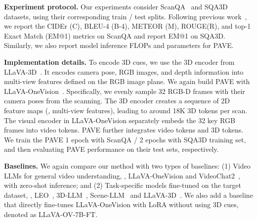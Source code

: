 \medskip
\noindent\textbf{Experiment protocol.} Our experiments consider ScanQA~\cite{azuma_2022_CVPR} and SQA3D~\cite{ma2022sqa3d} datasets, using their corresponding train / test splits. 
Following previous work~\cite{zhu2024llava3dsimpleeffectivepathway}, we report the CIDEr (C), BLEU-4 (B-4), METEOR (M), ROUGE(R), and top-1 Exact Match (EM@1) metrics on ScanQA and report EM@1 on SQA3D. Similarly, we also report model inference FLOPs and parameters for PAVE. 

\medskip
\noindent\textbf{Implementation details.}
To encode 3D cues, we use the 3D encoder from LLaVA-3D~\cite{zhu2024llava3dsimpleeffectivepathway}. It encodes camera pose, RGB images, and depth information into multi-view features defined on the RGB image plane. We again build PAVE with LLaVA-OneVision~\cite{li2024llava}. Specifically, we evenly sample 32 RGB-D frames with their camera poses from the scanning. The 3D encoder creates a sequence of 2D feature maps (\ie, multi-view features), leading to around 18K 3D tokens per scan. The visual encoder in LLaVA-OneVision separately embeds the 32 key RGB frames into video tokens. PAVE further integrates video tokens and 3D tokens. We train the PAVE 1 epoch with ScanQA / 2 epochs with SQA3D training set, and then evaluating PAVE performance on their test sets, respectively.

\medskip
\noindent\textbf{Baselines.} We again compare our method with two types of baselines: 
(1) Video LLMs for general video understanding, \eg, LLaVA-OneVision\cite{li2024llava} and VideoChat2~\cite{li2023mvbench}, with zero-shot inference; and 
(2) Task-specific models fine-tuned on the target dataset, \eg, LEO~\cite{huang2023embodied}, 3D-LLM~\cite{hong20233d}, Scene-LLM~\cite{fu2024scenellmextendinglanguagemodel} and LLaVA-3D~\cite{zhu2024llava3dsimpleeffectivepathway}. 
We also add a baseline that directly fine-tunes LLaVA-OneVision with LoRA without using 3D cues, denoted as LLaVA-OV-7B-FT. 

